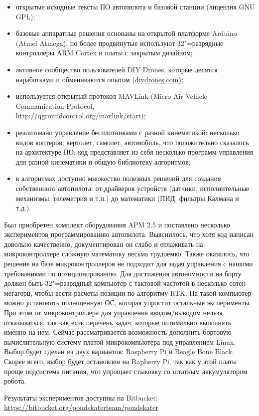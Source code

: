 \documentclass[10pt, a5paper]{article}
\begin{document}
\begin{itemize}
  \item открытые исходные тексты ПО автопилота и базовой станции (лицензия GNU GPL);
  \item базовые аппаратные решения основаны на открытой платформе Arduino (Atmel Atmega), но более продвинутые используют 32"=разрядные контроллеры ARM Cortex и платы с закрытым дизайном;
  \item активное сообщество пользователей DIY Drones, которые делятся наработками и обмениваются опытом (\url{diydrones.com});
  \item используется открытый протокол MAVLink (Micro Air Vehicle Communication Protocol, \\ \url{http://qgroundcontrol.org/mavlink/start});
  \item реализовано управление бесплотниками с разной кинематикой: несколько видов коптеров, вертолет, самолет, автомобиль, что положительно сказалось на архитектуре ПО: код представляет из себя несколько программ управления для разной кинематики и общую библиотеку алгоритмов;
  \item в алгоритмах доступно множество полезных решений для создания собственного автопилота: от драйверов устройств (датчики, исполнительные механизмы, телеметрия и т.п.) до математики (ПИД, фильтры Калмана и т.д.).
\end{itemize}

Был приобретен комплект оборудования APM 2.5 и поставлено несколько экспериментов программированию автопилота. Выяснилось, что хотя код написан довольно качественно, документирован он слабо и отлаживать на микроконтроллере сложную математику весьма трудоемко. Также оказалось, что решение на базе микроконтроллеров не подходит для задач управления с нашими требованиями по позиционированию. Для достижения автономности на борту должен быть 32"=разрядный компьютер с тактовой частотой в несколько сотен мегагерц, чтобы вести расчеты позиции по алгоритму RTK. На такой компьютер можно установить полноценную ОС, которая упростит остальные эксперименты. При этом от микроконтроллера для управления вводом/выводом нельзя отказываться, так как есть перечень задач, которые оптимально выполнять именно на нем. Сейчас рассматривается возможность дополнить бортовую вычислительную систему платой микрокомпьютера под управлением Linux. Выбор будет сделан из двух вариантов: Raspberry Pi и Beagle Bone Black. Скорее всего, выбор будет остановлен на Rapberry Pi, так как у этой платы проще подсистема питания, что упрощает стыковку со штатным аккумулятором робота.

Результаты экспериментов доступны на Bitbucket:\\ \url{https://bitbucket.org/pondskaterteam/pondskater}
\end{document}
